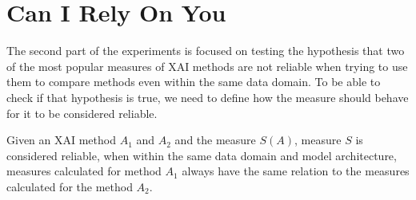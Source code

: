 \section{Can I Rely On You}\label{section:can-i-rely-on-you-definition}

The second part of the experiments is focused on testing the hypothesis that two of the most popular measures of XAI methods are not reliable when trying to use them to compare methods even within the same data domain. To be able to check if that hypothesis is true, we need to define how the measure should behave for it to be considered reliable.

\begin{definition}\label{def:reliability}
    Given an XAI method $A_1$ and $A_2$ and the measure $S(A)$, measure $S$ is considered reliable, when within the same data domain and model architecture, measures calculated for method $A_1$ always have the same relation to the measures calculated for the method $A_2$.
\end{definition}

